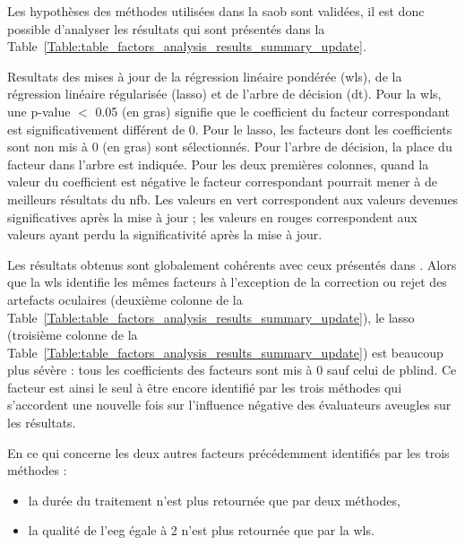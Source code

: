Les hypothèses des méthodes utilisées dans la \gls{saob} sont validées, il est donc possible d'analyser les résultats qui sont présentés dans la 
Table~\ref{Table:table_factors_analysis_results_summary_update}.

\begin{table}[h!]
  \centering
  \caption{Resultats des mises à jour de la régression linéaire pondérée (\gls{wls}), de la régression linéaire régularisée (\gls{lasso}) et de l'arbre de décision (\gls{dt}). Pour la \gls{wls}, une p-value $<$ 0.05 
	(en gras) signifie que le coefficient du facteur correspondant est significativement différent de 0. Pour le \gls{lasso}, les facteurs dont les coefficients sont non mis à 0 (en gras) sont 
	sélectionnés. Pour l'arbre de décision, la place du facteur dans l'arbre est indiquée. Pour les deux premières colonnes, quand la valeur du coefficient est négative le facteur 
	correspondant pourrait mener à de meilleurs résultats du \gls{nfb}. Les valeurs en vert correspondent aux valeurs devenues significatives après la mise à jour ; les valeurs
	en rouges correspondent aux valeurs ayant perdu la significativité après la mise à jour.}
  
  \label{Table:table_factors_analysis_results_summary_update}
\end{table}

Les résultats obtenus sont globalement cohérents avec ceux présentés dans \citet{Bussalb2019clinical}. Alors que la \gls{wls} identifie les mêmes facteurs à l'exception de la correction ou rejet 
des artefacts oculaires (deuxième colonne de la Table~\ref{Table:table_factors_analysis_results_summary_update}), le \gls{lasso} (troisième colonne de la 
Table~\ref{Table:table_factors_analysis_results_summary_update}) est beaucoup plus sévère : tous les coefficients des facteurs sont mis à 0 sauf celui de \gls{pblind}. Ce facteur est ainsi 
le seul à être encore identifié par les trois méthodes qui s'accordent une nouvelle fois sur l'influence négative des évaluateurs aveugles sur les résultats.  

En ce qui concerne les deux autres facteurs précédemment identifiés par les trois méthodes : 
\begin{itemize}
\item la durée du traitement n'est plus retournée que par deux méthodes, 
\item la qualité de l'\gls{eeg} égale à 2 n'est plus retournée que par la \gls{wls}. 
\end{itemize}

